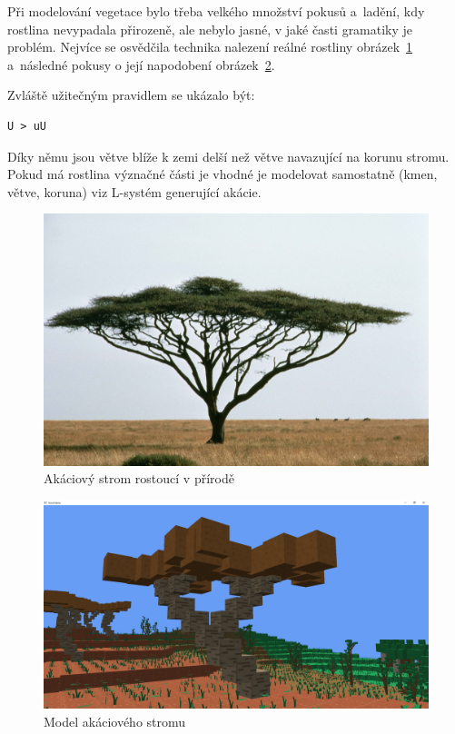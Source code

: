 \documentclass[thesis=M,czech]{FITthesis}[2019/12/23]
\begin{document}
Při modelování vegetace bylo třeba velkého množství pokusů a~ladění, kdy rostlina nevypadala přirozeně, ale nebylo jasné, v jaké časti gramatiky je problém. Nejvíce se osvědčila technika nalezení reálné rostliny obrázek~\ref{fig:acacia_nature} a~následné pokusy o její napodobení obrázek~\ref{fig:acacia_engine}.

Zvláště užitečným pravidlem se ukázalo být:

\begin{verbatim}
U > uU
\end{verbatim}

Díky němu jsou větve blíže k zemi delší než větve navazující na korunu stromu. Pokud má rostlina význačné části je vhodné je modelovat samostatně (kmen, větve, koruna) viz L-systém generující akácie.

\begin{figure}\centering
	\includegraphics[width=\textwidth]{images/acacia_nature}
	\caption[Akáciový strom rostoucí v přírodě]{Akáciový strom rostoucí v přírodě~\cite{acacia}}\label{fig:acacia_nature}
\end{figure}

\begin{figure}\centering
	\includegraphics[width=\textwidth]{images/acacia_engine}
	\caption[Model akáciového stromu]{Model akáciového stromu}\label{fig:acacia_engine}
\end{figure}
\end{document}
